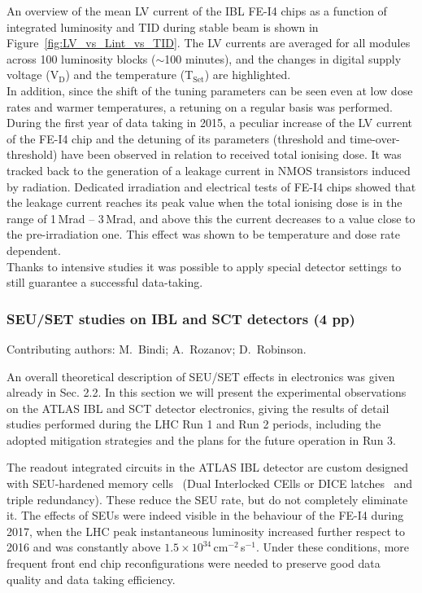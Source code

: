 An overview of the mean LV current of the IBL FE-I4 chips as a function of integrated luminosity and TID during stable beam is shown in Figure~\ref{fig:LV_vs_Lint_vs_TID}. The LV currents are averaged for all modules across 100 luminosity blocks ($\sim$100 minutes), and the changes in digital supply voltage (V$_{\mathrm{D}}$) and the temperature (T$_{\mathrm{Set}}$) are highlighted. \\ In addition, since the shift of the tuning parameters can be seen even at low dose rates and warmer temperatures, a retuning on a regular basis was performed.
During the first year of data taking in 2015, a peculiar increase of the LV current of the FE-I4 chip and the detuning of its parameters (threshold and time-over-threshold) have been observed in relation to received total ionising dose. It was tracked back to the generation of a leakage current in NMOS transistors induced by radiation.
Dedicated irradiation and electrical tests of FE-I4 chips showed that the leakage current reaches its peak value when the total ionising dose is in the range of 1\,Mrad -- 3\,Mrad, and above this the current decreases to a value close to the pre-irradiation one. This effect was shown to be temperature and dose rate dependent.\\
Thanks to intensive studies it was possible to apply special detector settings to still guarantee a successful data-taking.


\subsubsection{SEU/SET studies on IBL and SCT detectors (\textbf{4 pp})}
\label{sec:electronics-ATLAS-SEU}
Contributing authors: M.~Bindi; A.~Rozanov; D.~Robinson.

An overall theoretical description of SEU/SET effects in electronics was given already in Sec. 2.2. In this section we will  present the experimental observations on the ATLAS IBL and SCT detector electronics, giving the results of detail studies performed during the LHC Run 1 and Run 2 periods, including the adopted mitigation strategies and the plans for the future operation in Run 3.


The readout integrated circuits in the ATLAS IBL detector are custom designed with SEU-hardened memory cells~\cite{TWEPP2012} (Dual Interlocked CElls or DICE latches~\cite{DICE} and triple redundancy). These reduce the SEU rate, but do not completely eliminate it.
The effects of SEUs were indeed visible in the behaviour of the FE-I4 during 2017, when the LHC peak instantaneous luminosity increased further respect to 2016 and was constantly above $1.5 \times 10^{34}$\,cm$^{-2}$\,s$^{-1}$. Under these conditions, more frequent front end chip reconfigurations were needed to preserve good data quality and data taking efficiency. 

